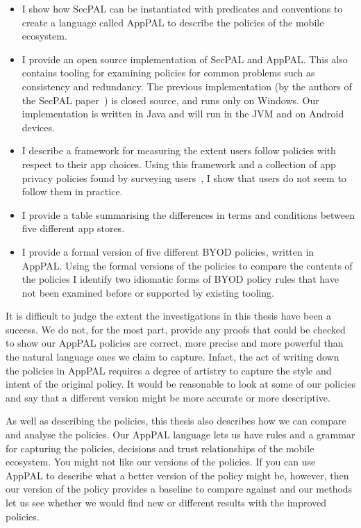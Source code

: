 \documentclass[thesis.tex]{subfiles}
\begin{document}
\begin{itemize}
  \item I show how SecPAL can be instantiated with predicates and conventions
    to create a language called AppPAL to describe the policies of the mobile
    ecosystem.
  \item I provide an open source implementation of SecPAL and AppPAL. This also
    contains tooling for examining policies for common problems such as
    consistency and redundancy.  The previous implementation (by the authors of
    the SecPAL paper~\cite{becker_secpal:_2006}) is closed source, and runs
    only on Windows.  Our implementation is written in Java and will run in the
    JVM and on Android devices.
  \item I describe a framework for measuring the extent users follow policies
    with respect to their app choices.  Using this framework and a collection
    of app privacy policies found by surveying users~\cite{lin_modeling_2014},
    I show that users do not seem to follow them in practice.
  \item I provide a table summarising the differences in terms and conditions
    between five different app stores.
  \item I provide a formal version of five different \ac{BYOD} policies, written in
    AppPAL.  Using the formal versions of the policies to compare the contents
    of the policies I identify two idiomatic forms of \ac{BYOD} policy rules that
    have not been examined before or supported by existing tooling.
\end{itemize}

It is difficult to judge the extent the investigations in this thesis have been
a success.  We do not, for the most part, provide any proofs that could be
checked to show our AppPAL policies are correct, more precise and more powerful
than the natural language ones we claim to capture.  Infact, the act of writing
down the policies in AppPAL requires a degree of artistry to capture the style
and intent of the original policy. It would be reasonable to look at some of
our policies and say that a different version might be more accurate or more
descriptive.

As well as describing the policies, this thesis also describes how we can
compare and analyse the policies. Our AppPAL language lets us have rules and a
grammar for capturing the policies, decisions and trust relationships of the
mobile ecosystem.  You might not like our versions of the policies. If you can
use AppPAL to describe what a better version of the policy might be, however,
then our version of the policy provides a baseline to compare against and our
methods let us see whether we would find new or different results with the
improved policies.
\end{document}
